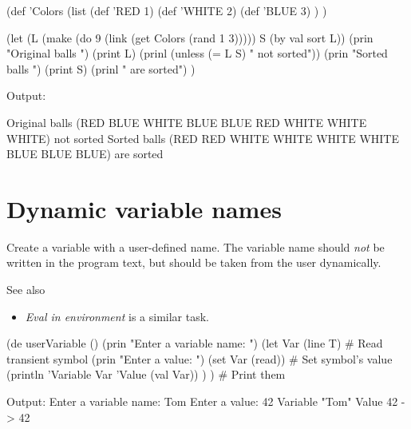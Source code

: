 \begin{wideverbatim}

(def 'Colors
   (list
      (def 'RED 1)
      (def 'WHITE 2)
      (def 'BLUE 3) ) )
 
(let (L (make (do 9 (link (get Colors (rand 1 3)))))  S (by val sort L))
   (prin "Original balls ")
   (print L)
   (prinl (unless (= L S) " not sorted"))
   (prin "Sorted balls   ")
   (print S)
   (prinl " are sorted") )

Output:

Original balls (RED BLUE WHITE BLUE BLUE RED WHITE WHITE WHITE) not sorted
Sorted balls   (RED RED WHITE WHITE WHITE WHITE BLUE BLUE BLUE) are sorted

\end{wideverbatim}


\pagebreak{}
\section*{Dynamic variable names}

Create a variable with a user-defined name. The variable name should
\emph{not} be written in the program text, but should be taken from the
user dynamically.

See also

\begin{itemize}
\item \emph{Eval in environment} is a similar task.
\end{itemize}



\begin{wideverbatim}

(de userVariable ()
   (prin "Enter a variable name: ")
   (let Var (line T)                                  # Read transient symbol
      (prin "Enter a value: ")
      (set Var (read))                                # Set symbol's value
      (println 'Variable Var 'Value (val Var)) ) )    # Print them

Output:
Enter a variable name: Tom
Enter a value: 42
Variable "Tom" Value 42
-> 42

\end{wideverbatim}



% 
